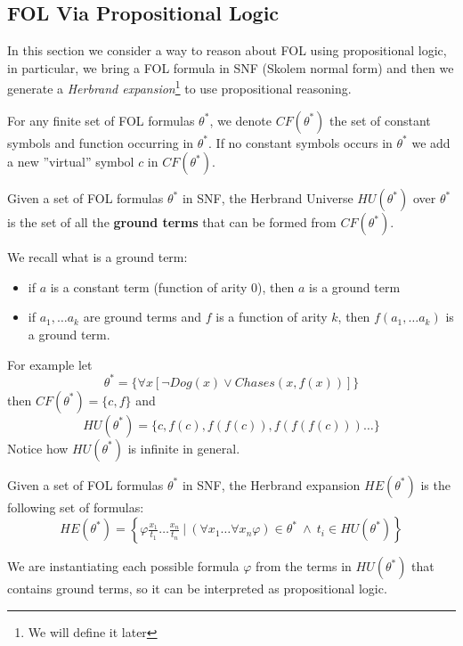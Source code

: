 \documentclass[10pt, letterpaper]{report}
\begin{document}
\subsection{FOL Via Propositional Logic}
In this section we consider a way to reason about FOL using propositional logic, in particular, we bring a FOL formula in SNF (Skolem normal form) and then we generate a \textit{Herbrand expansion}\footnote{We will define it later} to use propositional reasoning.\bigskip

For any finite set of FOL formulas $\theta^*$, we denote $CF(\theta^*)$ the set of constant symbols and function occurring in $\theta^*$. If no constant symbols occurs in $\theta^*$ we add a new ''virtual'' symbol $c$ in $CF(\theta^*)$.
\begin{definition}
    Given a set of FOL formulas $\theta^*$ in SNF, the Herbrand Universe $HU(\theta^*)$ over $\theta^*$ is the set of all the \textbf{ground terms} that can be formed from $CF(\theta^*)$. 
\end{definition}
We recall what is a ground term:\begin{itemize}
    \item if $a$ is a constant term (function of arity $0$), then $a$ is a ground term 
    \item if $a_1,\dots a_k$ are ground terms and $f$ is a function of arity $k$, then $f(a_1,\dots a_k)$ is a ground term.
\end{itemize}
For example let\begin{equation}
    \theta^*=\{\forall x[\lnot Dog(x)\lor Chases(x,f(x))]\}
\end{equation}
then $CF(\theta^*)=\{c,f\}$ and\begin{equation}
    HU(\theta^*)=\{c,f(c),f(f(c)), f(f(f(c)))\dots \}
\end{equation}
Notice how $HU(\theta^*)$ is infinite in general.
\begin{definition}
    Given a set of FOL formulas $\theta^*$ in SNF, the Herbrand expansion $HE(\theta^*)$ is the following set of formulas:\begin{equation}
        HE(\theta^*)=\left\{
            \varphi\tfrac{x_1}{t_1}\dots \tfrac{x_n}{t_n} \ | \ (\forall x_1\dots \forall x_n\varphi)\in \theta^* \ \land \ t_i\in HU(\theta^*)
        \right\}
    \end{equation}
\end{definition}
We are instantiating each possible formula $\varphi$ from the terms in $HU(\theta^*)$ that contains ground terms, so it can be interpreted as propositional logic.
\end{document}
